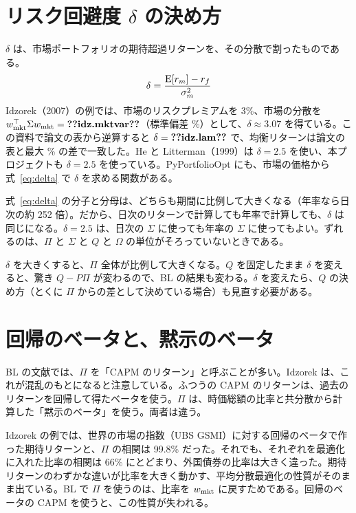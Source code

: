 \section{リスク回避度 $\delta$ の決め方}

$\delta$ は、市場ポートフォリオの期待超過リターンを、その分散で割ったものである。
\begin{equation}
\delta=\frac{\mathrm{E}[r_m]-r_f}{\sigma_m^2}
\label{eq:delta}
\end{equation}
Idzorek（2007）の例では、市場のリスクプレミアムを 3\%、市場の分散を $\wmkt\T\Sigma\wmkt=\V{idz.mktvar}$（標準偏差 \%）として、$\delta\approx3.07$ を得ている。この資料で論文の表から逆算すると $\delta=\V{idz.lam}$ で、均衡リターンは論文の表と最大 \% の差で一致した。He と Litterman（1999）は $\delta=2.5$ を使い、本プロジェクトも $\delta=2.5$ を使っている。PyPortfolioOpt にも、市場の価格から式~\eqref{eq:delta} で $\delta$ を求める関数がある。

\begin{tipbox}
式~\eqref{eq:delta} の分子と分母は、どちらも期間に比例して大きくなる（年率なら日次の約 252 倍）。だから、日次のリターンで計算しても年率で計算しても、$\delta$ は同じになる。$\delta=2.5$ は、日次の $\Sigma$ に使っても年率の $\Sigma$ に使ってもよい。ずれるのは、$\Pi$ と $\Sigma$ と $Q$ と $\Omega$ の単位がそろっていないときである。
\end{tipbox}

$\delta$ を大きくすると、$\Pi$ 全体が比例して大きくなる。$Q$ を固定したまま $\delta$ を変えると、驚き $Q-P\Pi$ が変わるので、BL の結果も変わる。$\delta$ を変えたら、$Q$ の決め方（とくに $\Pi$ からの差として決めている場合）も見直す必要がある。

\section{回帰のベータと、黙示のベータ}

BL の文献では、$\Pi$ を「CAPM のリターン」と呼ぶことが多い。Idzorek は、これが混乱のもとになると注意している。ふつうの CAPM のリターンは、過去のリターンを回帰して得たベータを使う。$\Pi$ は、時価総額の比率と共分散から計算した「黙示のベータ」を使う。両者は違う。

Idzorek の例では、世界の市場の指数（UBS GSMI）に対する回帰のベータで作った期待リターンと、$\Pi$ の相関は 99.8\% だった。それでも、それぞれを最適化に入れた比率の相関は 66\% にとどまり、外国債券の比率は大きく違った。期待リターンのわずかな違いが比率を大きく動かす、平均分散最適化の性質がそのまま出ている。BL で $\Pi$ を使うのは、比率を $w_{\mathrm{mkt}}$ に戻すためである。回帰のベータの CAPM を使うと、この性質が失われる。

